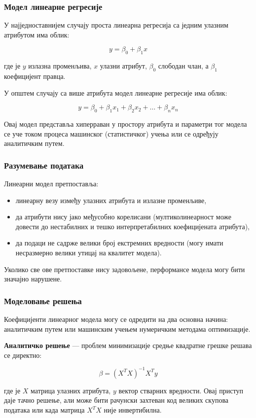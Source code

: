 \subsubsection{Модел линеарне регресије}
У најједноставнијем случају проста линеарна регресија са једним улазним атрибутом има облик:

\[
y = \beta_{0} + \beta_{1} x
\]

где је $y$ излазна променљива, $x$ улазни атрибут, $\beta_0$ слободан члан, а $\beta_1$ коефицијент правца.

У општем случају са више атрибута модел линеарне регресије има облик:

\[
y = \beta_{0} + \beta_{1} x_{1} + \beta_{2} x_{2} + \ldots + \beta_{n} x_{n}
\]

Овај модел представља хиперраван у простору атрибута и параметри тог модела се уче током процеса машинског (статистичког) учења или се одређују аналитичким путем.

\subsubsection{Разумевање података}
Линеарни модел претпоставља:

\begin{itemize}
  \item линеарну везу између улазних атрибута и излазне променљиве,
  \item да атрибути нису јако међусобно корелисани (мултиколинеарност може довести до нестабилних и тешко интерпретабилних коефицијената атрибута),
  \item да подаци не садрже велики број екстремних вредности (могу имати несразмерно велики утицај на квалитет модела).
\end{itemize}
Уколико све ове претпоставке нису задовољене, перформансе модела могу бити значајно нарушене.

\subsubsection{Моделовање решења}
Коефицијенти линеарног модела могу се одредити на два основна начина: аналитичким путем или машинским учењем нумеричким методама оптимизације.

\textbf{Аналитичко решење} — проблем минимизације средње квадратне грешке решава се директно:

\[
\beta = (X^{T} X)^{-1} X^{T} y
\]

где је $X$ матрица улазних атрибута, $y$ вектор стварних вредности. Овај приступ даје тачно решење, али може бити рачунски захтеван код великих скупова података или када матрица $X^{T} X$ није инвертибилна.

